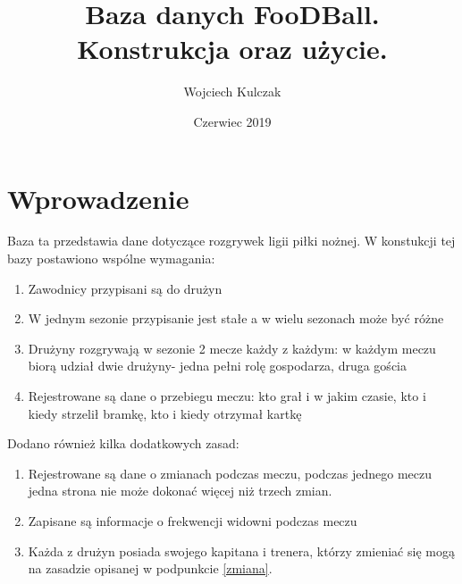 \documentclass{article}
\title{Baza danych FooDBall. Konstrukcja oraz użycie.}
\author{Wojciech Kulczak}
\date{Czerwiec 2019}
\begin{document}
\maketitle
\newpage
\section{Wprowadzenie}

Baza ta przedstawia dane dotyczące rozgrywek ligii piłki nożnej. \newline
W konstukcji tej bazy postawiono wspólne wymagania:
\begin{enumerate}
    \item Zawodnicy przypisani są do drużyn
    \item \label{zmiana} W jednym sezonie przypisanie jest stałe a w wielu sezonach może być różne
    \item Drużyny rozgrywają w sezonie 2 mecze każdy z każdym: w każdym meczu biorą udział dwie drużyny- jedna pełni rolę gospodarza, druga gościa
    \item Rejestrowane są dane o przebiegu meczu: kto grał i w jakim czasie, kto i kiedy strzelił bramkę, kto i kiedy otrzymał kartkę 
\end{enumerate}
Dodano również kilka dodatkowych zasad:
\begin{enumerate}[resume]
    \item Rejestrowane są dane o zmianach podczas meczu, podczas jednego meczu jedna strona nie może dokonać więcej niż trzech zmian.
    \item Zapisane są informacje o frekwencji widowni podczas meczu 
    \item Każda z drużyn posiada swojego kapitana i trenera, którzy zmieniać się mogą na zasadzie opisanej w podpunkcie \ref{zmiana}. 
\end{enumerate}
\newpage
\end{document}
